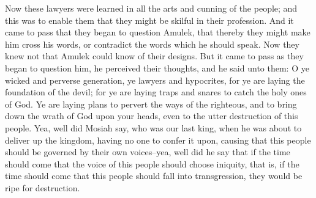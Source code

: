 \bverse \iffalse Now these lawyers were learned in all the arts and cunning of the people; and this was to enable them that they might be skilful in their profession. \fi
Now these lawyers were learned in all the arts and cunning of the people; and this was to enable them that they might be skilful in their profession.
\bverse \iffalse And it came to pass that they began to question Amulek, that thereby they might make him cross his words, or contradict the words which he should speak. \fi
And it came to pass that they began to question Amulek, that thereby they might make him cross his words, or contradict the words which he should speak.
\bverse \iffalse Now they knew not that Amulek could know of their designs.  But it came to pass as they began to question him, he perceived their thoughts, and he said unto them: O ye wicked and perverse generation, ye lawyers and hypocrites, for ye are laying the foundation of the devil; for ye are laying traps and snares to catch the holy ones of God. \fi
Now they knew not that Amulek could know of their designs.  But it came to pass as they began to question him, he perceived their thoughts, and he said unto them: O ye wicked and perverse generation, ye lawyers and hypocrites, for ye are laying the foundation of the devil; for ye are laying traps and snares to catch the holy ones of God.
\bverse \iffalse Ye are laying plans to pervert the ways of the righteous, and to bring down the wrath of God upon your heads, even to the utter destruction of this people. \fi
Ye are laying plans to pervert the ways of the righteous, and to bring down the wrath of God upon your heads, even to the utter destruction of this people.
\bverse \iffalse Yea, well did Mosiah say, who was our last king, when he was about to deliver up the kingdom, having no one to confer it upon, causing that this people should be governed by their own voices--yea, well did he say that if the time should come that the voice of this people should choose iniquity, that is, if the time should come that this people should fall into transgression, they would be ripe for destruction. \fi
Yea, well did Mosiah say, who was our last king, when he was about to deliver up the kingdom, having no one to confer it upon, causing that this people should be governed by their own voices--yea, well did he say that if the time should come that the voice of this people should choose iniquity, that is, if the time should come that this people should fall into transgression, they would be ripe for destruction.
